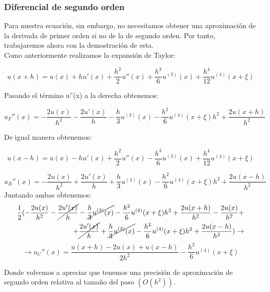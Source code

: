 \documentclass[12pt]{article}
\begin{document}
\subsubsection{Diferencial de segundo orden}

Para nuestra ecuación, sin embargo, no necesitamos obtener una aproximación de la derivada de primer orden si no de la de segundo orden. Por tanto, trabajaremos ahora con la demostración de esta.\\

Como anteriormente realizamos la expansión de Taylor:

\begin{equation*}
u(x+h)=u(x) + hu'(x)+ \frac{h^2}{2}  u''(x) + \frac{h^3}{6} u^{(3)}(x)+\frac{h^4}{12}u^{(4)}(x+\xi)
\end{equation*}

Pasando el término u''(x) a la derecha obtenemos:

\begin{equation}
u_F''(x)=-\frac{2u(x)}{h^2} - \frac{2u'(x)}{h} - \frac{h}{3}u^{(3)}(x)-\frac{h^2}{6}u^{(4)}(x+\xi) {h^2} + \frac{2u(x+h)}{h^2}
\end{equation}

De igual manera  obtenemos:

\begin{equation*}
u(x-h)=u(x) - hu'(x)+ \frac{h^2}{2}  u''(x) - \frac{h^3}{6} u^{(3)}(x)+\frac{h^4}{12}u^{(4)}(x+\xi)
\end{equation*}

\begin{equation}
u_B''(x)=-\frac{2u(x)}{h^2}  + \frac{2u'(x)}{h} + \frac{h}{3}u^{(3)}(x)-\frac{h^2}{6}u^{(4)}(x+\xi) {h^2} + \frac{2u(x-h)}{h^2}
\end{equation}
Juntando ambas obtenemos:
\begin{eqnarray*}
\frac{1}{2}(-\frac{2u(x)}{h^2} - \cancel{\frac{2u'(x)}{h}} - \cancel{\frac{h}{3}u^{(3)}(x)}-\frac{h^2}{6}u^{(4)}(x+\xi) {h^2} + \frac{2u(x+h)}{h^2} -\frac{2u(x)}{h^2} + \\ + \cancel{\frac{2u'(x)}{h}} +\cancel{\frac{h}{3}u^{(3)}(x)}-\frac{h^2}{6}u^{(4)}(x+\xi) {h^2} + \frac{2u(x-h)}{h^2}) \rightarrow
\end{eqnarray*}
\begin{equation}
\rightarrow u_C''(x)=\frac{u(x+h)-2u(x)+u(x-h)}{2h^2} - \frac{h^2}{6}u^{(4)}(x+\xi)
\end{equation}

Donde volvemos a apreciar que tenemos una precisión de aproximación de segundo orden relativa al tamaño del paso $(O(h^2))$.
\end{document}
